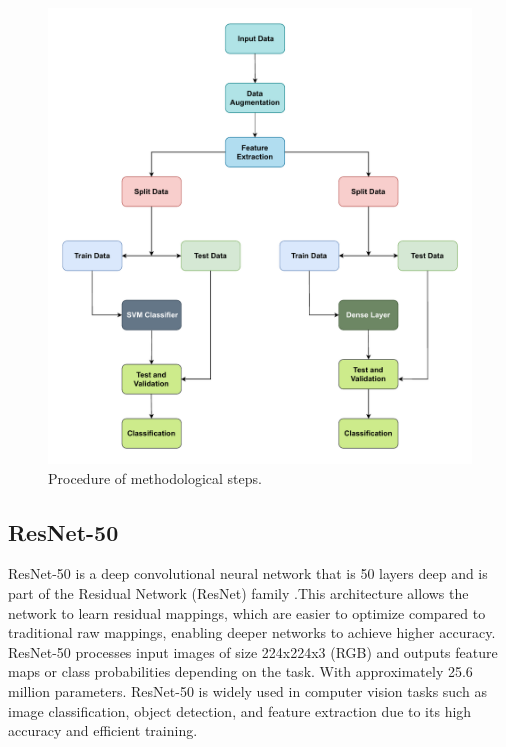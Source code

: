 \begin{figure}[H]
\begin{center}
    \includegraphics[width=15cm]{./fig/methodology.pdf}
\caption{Procedure of methodological steps.}
\label{tab:augmentation}
\end{center}
\end{figure}

\newpage
\subsection{ResNet-50}
\label{sec:sec3_3_1}
ResNet-50 is a deep convolutional neural network that is 50 layers deep and is part of the Residual Network (ResNet) family \cite{b25}.This architecture allows the network to learn residual mappings, which are easier to optimize compared to traditional raw mappings, enabling deeper networks to achieve higher accuracy. ResNet-50 processes input images of size 224x224x3 (RGB) and outputs feature maps or class probabilities depending on the task. With approximately 25.6 million parameters. ResNet-50 is widely used in computer vision tasks such as image classification, object detection, and feature extraction due to its high accuracy and efficient training.

